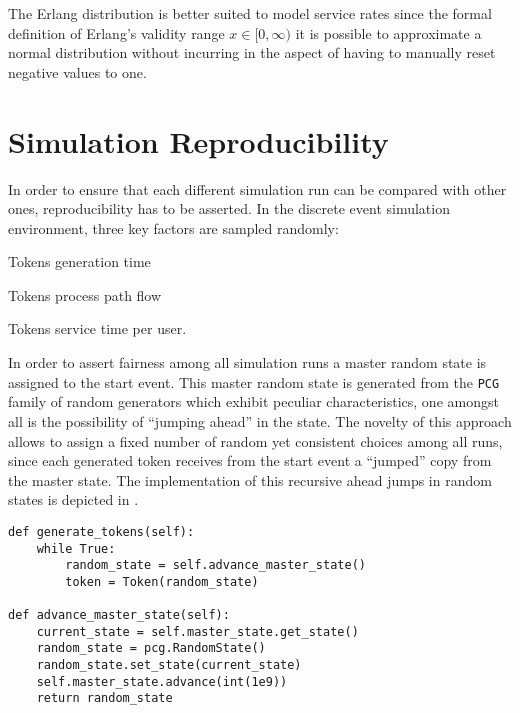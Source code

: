 The Erlang distribution is better suited to model service rates since the formal definition of Erlang's validity range $x \in [0,\infty)$ it is possible to approximate a normal distribution without incurring in the aspect of having to manually reset negative values to one.

\section{Simulation Reproducibility}
\label{sec:sim_reproducibility}

In order to ensure that each different simulation run can be compared with other ones, reproducibility has to be asserted. In the discrete event simulation environment, three key factors are sampled randomly:
\begin{enumerate*}
    \item Tokens generation time
    \item Tokens process path flow
    \item Tokens service time per user.
\end{enumerate*}

In order to assert fairness among all simulation runs a master random state is assigned to the start event. This master random state is generated from the \texttt{PCG} family of random generators which exhibit peculiar characteristics, one amongst all is the possibility of ``jumping ahead'' in the state. The novelty of this approach allows to assign a fixed number of random yet consistent choices among all runs, since each generated token receives from the start event a ``jumped'' copy from the master state. The implementation of this recursive ahead jumps in random states is depicted in .

\begin{lstlisting}[caption=Random state advancement method which initially copies the current state of the master random state. It then creates a new random state and sets its state to the former copy then eventually advances the master random state by \num{1e9} units.,label=lst:random_state_jump,style=CustomPython]
def generate_tokens(self):
    while True:
        random_state = self.advance_master_state()
        token = Token(random_state)

def advance_master_state(self):
    current_state = self.master_state.get_state()
    random_state = pcg.RandomState()
    random_state.set_state(current_state)
    self.master_state.advance(int(1e9))
    return random_state
\end{lstlisting}

